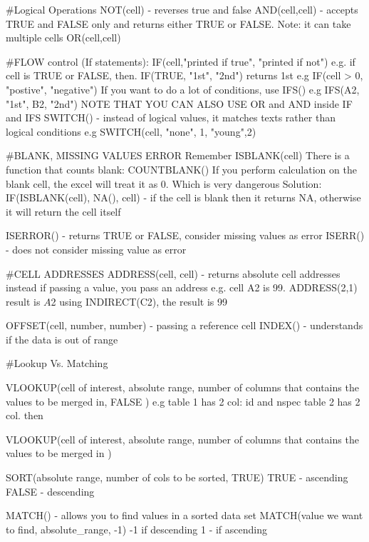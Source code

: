 #Logical Operations
NOT(cell) - reverses true and false
AND(cell,cell) - accepts TRUE and FALSE only and returns either TRUE or FALSE. Note: it can take multiple cells
OR(cell,cell)

#FLOW control (If statements):
IF(cell,"printed if true", "printed if not")
e.g. if cell is TRUE or FALSE, then. IF(TRUE, "1st", "2nd") returns 1st
e.g IF(cell > 0, "postive", "negative")
If you want to do a lot of conditions, use IFS()
e.g IFS(A2, "1st", B2, "2nd")
NOTE THAT YOU CAN ALSO USE OR and AND inside IF and IFS
SWITCH() - instead of logical values, it matches texts rather than logical conditions  
e.g SWITCH(cell, "none", 1, "young",2)

 #BLANK, MISSING VALUES ERROR
 Remember ISBLANK(cell)
 There is a function that counts blank: COUNTBLANK()
 If you perform calculation on the blank cell, the excel will treat it as 0. Which is very dangerous
 Solution:
 IF(ISBLANK(cell), NA(), cell) - if the cell is blank then it returns NA, otherwise it will return the cell itself
  
ISERROR() - returns TRUE or FALSE, consider missing values as error
ISERR() - does not consider missing value as error


#CELL ADDRESSES
ADDRESS(cell, cell) - returns absolute cell addresses
instead if passing a value, you pass an address
e.g. cell A2 is 99. ADDRESS(2,1) result is $A$2
using INDIRECT(C2), the result is 99

OFFSET(cell, number, number) - passing a reference cell
INDEX() - understands if the data is out of range

#Lookup Vs. Matching

VLOOKUP(cell of interest, absolute range, number of columns that contains the values to be merged in, FALSE )
e.g table 1 has 2 col: id and nspec
table 2 has 2 col. then

VLOOKUP(cell of interest, absolute range, number of columns that contains the values to be merged in )

SORT(absolute range, number of cols to be sorted, TRUE)
TRUE - ascending
FALSE - descending

MATCH() - allows you to find values in a sorted data set 
MATCH(value we want to find, absolute_range, -1)
-1 if descending
1 - if ascending






